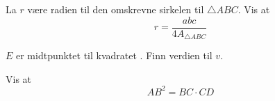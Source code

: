 La $ r $ være radien til den omskrevne sirkelen til $ \triangle ABC $. Vis at
\[ r=\frac{abc}{4A_{\triangle ABC}} \]







$ E $ er midtpunktet til kvadratet . Finn verdien til $ v $.

\newpage
{}
Vis at
\[ AB^2 = BC\cdot CD \]






